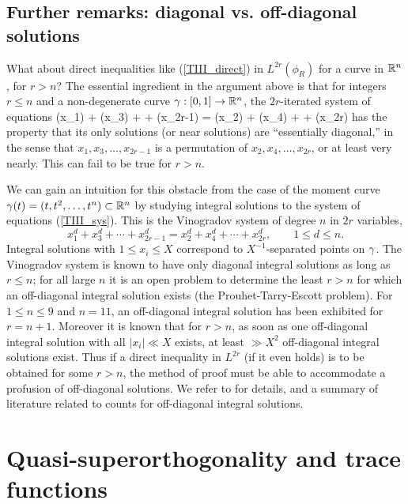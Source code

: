 \documentclass[oneside,11pt]{amsart}
\begin{document}
 
\subsection{Further remarks: diagonal vs. off-diagonal solutions}
What about direct inequalities like (\ref{TIII_direct}) in $L^{2r}(\phi_R)$ for a curve in $\mathbb{R}^n$, for $r> n$? 
The essential ingredient in the argument above is that for integers $r \leq n$ and a non-degenerate curve $\gamma :[0,1] \rightarrow \mathbb{R}^n$,
 the $2r$-iterated system of equations
\beq\label{TIII_sys}
 \ga(x_1) + \ga(x_3) + \cdots + \ga(x_{2r-1}) = \ga(x_2) + \ga(x_4) + \cdots + \ga(x_{2r}) 
 \eeq
has the property that its only solutions (or near solutions) are ``essentially diagonal,'' in the sense that $x_1, x_3, \ldots, x_{2r-1}$ is a permutation of $x_2, x_4, \ldots, x_{2r}$, or at least very nearly. 
 This can fail to be true for $r>n$. 
 
 We can gain an intuition for this obstacle from the case of the moment curve $\gamma(t) = (t,t^2,\ldots, t^n) \subset \mathbb{R}^n$
 by studying integral solutions to the system of equations (\ref{TIII_sys}). This is the Vinogradov system of degree $n$ in $2r$ variables,
 \[ x_1^d + x_3^d + \cdots + x_{2r-1}^d = x_2^d + x_4^d + \cdots + x_{2r}^d, \qquad 1 \leq d \leq n.\]
Integral solutions with $1 \leq x_i \leq X$ correspond to $X^{-1}$-separated points  on $\gamma$. 
 The Vinogradov system is known to have only diagonal integral solutions as long as $r \leq n$; for all large $n$ it is an open problem to determine the  least $r>n$ for which an off-diagonal integral solution  exists (the Prouhet-Tarry-Escott problem). 
 For $ 1 \leq n \leq 9$ and $n=11$, an off-diagonal integral solution has been exhibited for $r=n+1$. 
 Moreover it is  known that for $r>n$, as soon as one off-diagonal integral solution with all $|x_i| \ll X$ exists, at least $\gg X^2$ off-diagonal integral solutions exist. Thus  if a direct inequality in $L^{2r}$ (if it even holds)  is to be obtained  for some $r>n$,   the method of proof must be able to accommodate a profusion of off-diagonal solutions.
We refer to \cite[\S 2]{GGPRY19x} for details, and a summary of literature related to counts for off-diagonal integral solutions. 

 
  

  
  
  
\section{Quasi-superorthogonality and trace functions}\label{sec_trace} 
\end{document}
